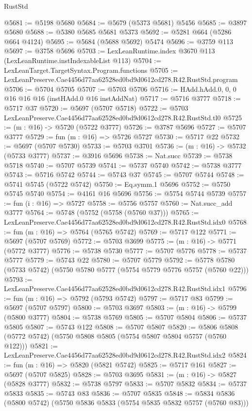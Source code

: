 \begin{lexlean}{RustStd}
\begin{coremodule}
@5681 := @5198 @5680
@5684 := @5679 (@5373 @5681) @5456
@5685 := @3897 @5680
@5688 := @5380 @5685 @5681 @5373
@5692 := @5281 @664 (@5286 @664 @4124)
@5695 := @5684 (@5688 @5692) @5474
@5696 := @3759 @113
@5697 := @3758 @5696
@5703 := LexLeanRuntime.index @3670 @113 (LexLeanRuntime.instIndexableList @113)
@5704 := LexLeanTarget.TargetSyntax.Program.functions
@5705 := LexLeanPreserve.Cae4456d77aa62528ed0bd9d0612cd278.R42.RustStd.program
@5706 := @5704 @5705
@5707 := @5703 @5706
@5716 := HAdd.hAdd.{0, 0, 0} @16 @16 @16 (instHAdd.{0} @16 instAddNat)
@5717 := @5716 @3777
@5718 := @5717 @37
@5720 := @5697 (@5707 @5718)
@5722 := @5703 LexLeanPreserve.Cae4456d77aa62528ed0bd9d0612cd278.R42.RustStd.tl0
@5725 := (m : @16) -> @5720 (@5722 @3777)
@5726 := @3787 @5696
@5727 := @5707 @3777
@5729 := fun (m : @16) => @5726 @5727
@5730 := @5717 @22
@5732 := @5697 (@5707 @5730)
@5733 := @5703 @3701
@5736 := (m : @16) -> @5732 (@5733 @3777)
@5737 := @3916 @5696
@5738 := Nat.succ
@5739 := @5738 @5718
@5740 := @5707 @5739
@5741 := @5737 @5740
@5742 := @5738 @3777
@5743 := @5716 @5742
@5744 := @5743 @37
@5745 := @5707 @5744
@5748 := @5741 @5745 (@5722 @5742)
@5750 := Eq.symm.{1} @5696
@5752 := @5750 @5745 @5740
@5754 := @4161 @16 @5696
@5756 := @5754 @5744 @5739
@5757 := fun (i : @16) => @5727
@5758 := @5756 @5757
@5760 := Nat.succ_add @3777
@5764 := @5748 (@5752 (@5758 (@5760 @37)))
@5765 := LexLeanPreserve.Cae4456d77aa62528ed0bd9d0612cd278.R42.RustStd.idx0
@5768 := fun (m : @16) => @5764 (@5765 @5742)
@5769 := @5717 @122
@5771 := @5697 (@5707 @5769)
@5772 := @5703 @3699
@5775 := (m : @16) -> @5771 (@5772 @3777)
@5776 := @5738 @5730
@5777 := @5707 @5776
@5778 := @5737 @5777
@5779 := @5743 @22
@5780 := @5707 @5779
@5792 := @5778 @5780 (@5733 @5742) (@5750 @5780 @5777 (@5754 @5779 @5776 @5757 (@5760 @22)))
@5793 := LexLeanPreserve.Cae4456d77aa62528ed0bd9d0612cd278.R42.RustStd.idx1
@5796 := fun (m : @16) => @5792 (@5793 @5742)
@5797 := @5717 @83
@5799 := @5697 (@5707 @5797)
@5800 := @5703 @3697
@5803 := (m : @16) -> @5799 (@5800 @3777)
@5804 := @5738 @5769
@5805 := @5707 @5804
@5806 := @5737 @5805
@5807 := @5743 @122
@5808 := @5707 @5807
@5820 := @5806 @5808 (@5772 @5742) (@5750 @5808 @5805 (@5754 @5807 @5804 @5757 (@5760 @122)))
@5821 := LexLeanPreserve.Cae4456d77aa62528ed0bd9d0612cd278.R42.RustStd.idx2
@5824 := fun (m : @16) => @5820 (@5821 @5742)
@5825 := @5717 @161
@5827 := @5697 (@5707 @5825)
@5828 := @5703 @3695
@5831 := (m : @16) -> @5827 (@5828 @3777)
@5832 := @5738 @5797
@5833 := @5707 @5832
@5834 := @5737 @5833
@5835 := @5743 @83
@5836 := @5707 @5835
@5848 := @5834 @5836 (@5800 @5742) (@5750 @5836 @5833 (@5754 @5835 @5832 @5757 (@5760 @83)))

\end{coremodule}
\end{lexlean}
